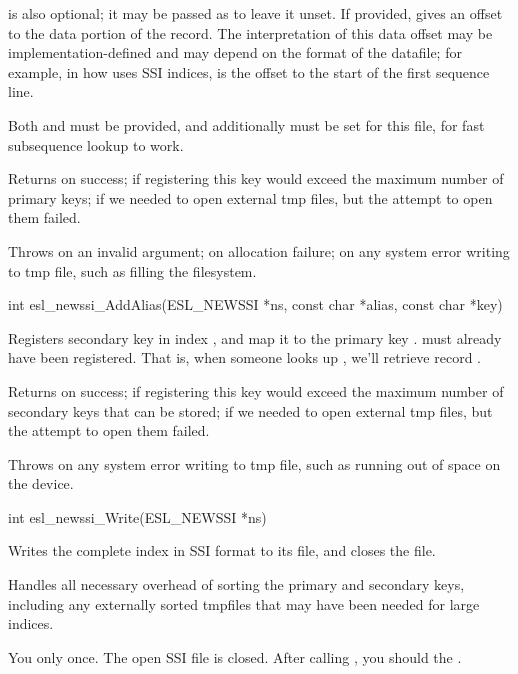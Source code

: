 \begin{sreapi}
 is also optional; it may be passed as  to
leave it unset. If provided,  gives an offset to
the data portion of the record. The interpretation of
this data offset may be implementation-defined and may
depend on the format of the datafile; for example, in how
 uses SSI indices,  is the offset to the
start of the first sequence line.

Both  and  must be provided, and additionally
 must be set for this file, for fast
subsequence lookup to work.

Returns         on success;
    if registering this key would exceed the maximum
number of primary keys;
 if we needed to open external tmp files, but
the attempt to open them failed.

Throws  on an invalid argument;
   on allocation failure;
 on any system error writing to tmp file, such
as filling the filesystem.


\hypertarget{func:esl_newssi_AddAlias()}
{\item[int esl\_newssi\_AddAlias(ESL\_NEWSSI *ns, const char *alias, const char *key)]}

Registers secondary key  in index , and 
map it to the primary key .  must already
have been registered. That is, when someone looks up ,
we'll retrieve record . 

Returns         on success;
    if registering this key would exceed the maximum
number of secondary keys that can be stored;
 if we needed to open external tmp files, but
the attempt to open them failed.

Throws    on any system error writing to tmp file, such 
as running out of space on the device.


\hypertarget{func:esl_newssi_Write()}
{\item[int esl\_newssi\_Write(ESL\_NEWSSI *ns)]}

Writes the complete index  in SSI format to its file,
and closes the file.

Handles all necessary overhead of sorting the primary and
secondary keys, including any externally sorted tmpfiles that
may have been needed for large indices.

You only  once. The open SSI file is closed.
After calling , you should  the
.


\end{sreapi}
